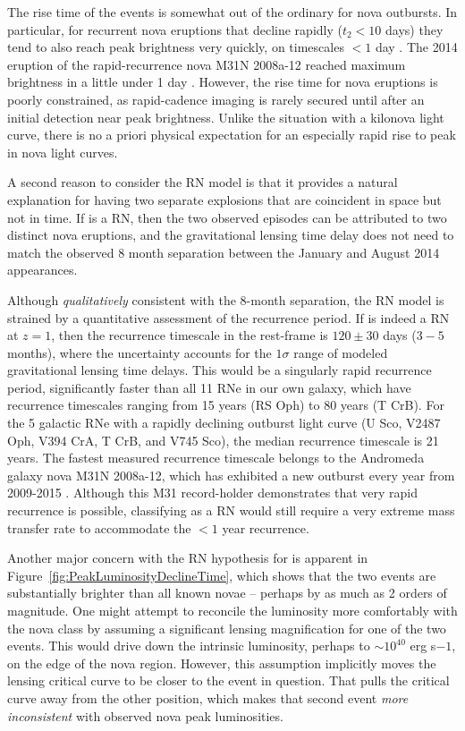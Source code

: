 The rise time of the \spock events is somewhat out of the ordinary for
nova outbursts.  In particular, for recurrent nova eruptions that
decline rapidly ($t_2<10$ days) they tend to also reach peak
brightness very quickly, on timescales $<1$ day
\citep{Schaefer:2010}. The 2014 eruption of the rapid-recurrence nova
M31N 2008a-12 reached maximum brightness in a little under 1 day
\citep{Darnley:2015}.  However, the rise time for nova eruptions is
poorly constrained, as rapid-cadence imaging is rarely secured until
after an initial detection near peak brightness.  Unlike the situation
with a kilonova light curve, there is no a priori physical expectation
for an especially rapid rise to peak in nova light curves.

A second reason to consider the RN model is that it provides a
natural explanation for having two separate explosions that are
coincident in space but not in time.  If \spock is a RN, then the two
observed episodes can be attributed to two distinct nova eruptions,
and the gravitational lensing time delay does not need to match the
observed 8 month separation between the January and August 2014
appearances.

Although {\it qualitatively} consistent with the 8-month separation,
the RN model is strained by a quantitative assessment of the
recurrence period. If \spock is indeed a RN at $z=1$, then the
recurrence timescale in the rest-frame is $120\pm30$ days ($3-5$
months), where the uncertainty accounts for the $1\sigma$ range of
modeled gravitational lensing time delays.  This would be a singularly
rapid recurrence period, significantly faster than all 11 RNe in our
own galaxy, which have recurrence timescales ranging from 15 years (RS
Oph) to 80 years (T CrB). For the 5 galactic RNe with a rapidly
declining outburst light curve (U Sco, V2487 Oph, V394 CrA, T CrB, and
V745 Sco), the median recurrence timescale is 21 years.  The fastest
measured recurrence timescale belongs to the Andromeda galaxy nova
M31N 2008a-12, which has exhibited a new outburst every year from
2009-2015
\citep{Tang:2014,Darnley:2014,Darnley:2015,Henze:2015,Henze:2015a}. Although
this M31 record-holder demonstrates that very rapid recurrence is
possible, classifying \spock as a RN would still require a very
extreme mass transfer rate to accommodate the $<1$ year recurrence.

Another major concern with the RN hypothesis for \spock is apparent
in Figure~\ref{fig:PeakLuminosityDeclineTime}, which shows that the
two \spock events are substantially brighter than all known novae --
perhaps by as much as 2 orders of magnitude.  One might attempt to
reconcile the \spock luminosity more comfortably with the nova class
by assuming a significant lensing magnification for one of the two
events. This would drive down the intrinsic luminosity, perhaps to
$\sim10^{40}$ erg s${-1}$, on the edge of the nova region.  However,
this assumption implicitly moves the lensing critical curve to be
closer to the \spock event in question.  That pulls the critical curve
away from the other \spock position, which makes that second event
{\it more inconsistent} with observed nova peak luminosities.  

